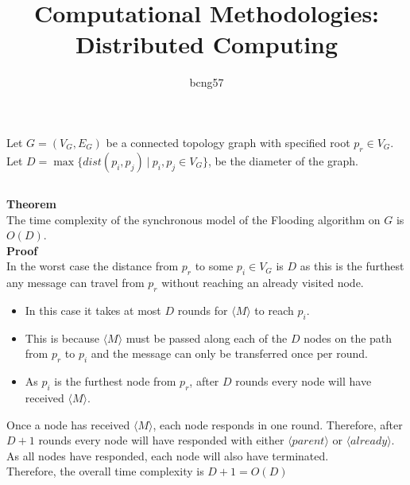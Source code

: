 \documentclass[11pt]{article}
\title{\vspace{-2.5cm}Computational Methodologies: Distributed Computing}
\author{bcng57}
\date{}
\begin{document}
\maketitle

\section{}

Let $G=(V_G, E_G)$ be a connected topology graph with specified root $p_r\in V_G$. Let $D=\max\{dist(p_i,p_j)\ |\ p_i,p_j\in V_G\}$, be the diameter of the graph.

\subsection{}

\textbf{Theorem}\\
The time complexity of the synchronous model of the Flooding algorithm on $G$ is $O(D)$.\\

\textbf{Proof}\\
In the worst case the distance from $p_r$ to some $p_i \in V_G$ is $D$ as this is the furthest any message can travel from $p_r$ without reaching an already visited node.
\begin{itemize}
\item In this case it takes at most $D$ rounds for $\langle M \rangle$ to reach $p_i$.
\item This is because $\langle M \rangle$ must be passed along each of the $D$ nodes on the path from $p_r$ to $p_i$ and  the message can only be transferred once per round.
\item As $p_i$ is the furthest node from $p_r$, after $D$ rounds every node will have received $\langle M \rangle$.
\end{itemize}
Once a node has received $\langle M \rangle$, each node responds in one round. Therefore, after $D+1$ rounds every node will have responded with either $\langle parent \rangle$ or $\langle already \rangle$. As all nodes have responded, each node will also have terminated.\\
Therefore, the overall time complexity is $D+1=O(D)$ %

\newpage

\subsection{}
\end{document}
